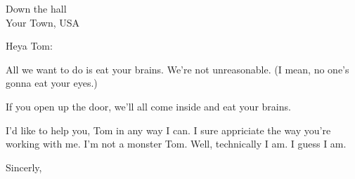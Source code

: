 \documentclass{letter}
\begin{document}
\longindentation=0pt

\begin{letter}{  Down the hall \\ Your Town, USA }

\opening{  Heya Tom: }

All we want to do is eat your brains. We're not unreasonable. (I mean,
no one's gonna eat your eyes.)

If you open up the door, we'll all come inside and eat your brains.

I'd like to help you, Tom in any way I can. I sure appriciate the way
you're working with me. I'm not a monster Tom. Well, technically I am. I
guess I am.


\vspace{1 em}

\closing{Sincerly,}




\end{letter}
\end{document}
